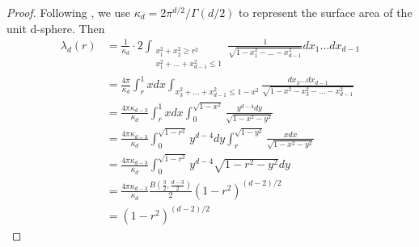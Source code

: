 \documentclass{aptpub}
\begin{document}
\begin{proof}
     Following \cite{dwyer1991convex}, we use $\kappa_d = 2\pi^{d/2}/\Gamma(d/2)$
     to represent the surface area of the unit d-sphere. Then
     \begin{align*}
          \lambda_d(r) &=\frac{1}{\kappa_d} 
          \cdot 2\int_{\substack{x_1^2+x_2^2\geq r^2\\
          x_1^2+\dots+x_{d-1}^2\leq 1 }} 
          \frac{1}{\sqrt{1-x_1^2-\dots -x_{d-1}^2}} dx_1 \dots dx_{d-1}\\
      &= \frac{4\pi}{\kappa_d} \int_r^1 xdx \int_{x_3^2+\dots + x_{d-1}^2 \leq 1-x^2} \frac{dx_3\dots dx_{d-1}}
      {\sqrt{1-x^2-x_3^2-\dots -x_{d-1}^2}} \\
      &=\frac{4\pi \kappa_{d-3}}{\kappa_d} \int_r^1 xdx \int_0^{\sqrt{1-x^2}} \frac{y^{d-4}dy}{\sqrt{1-x^2-y^2}}\\
      &=\frac{4\pi \kappa_{d-3}}{\kappa_d} \int_0^{\sqrt{1-r^2}} y^{d-4}dy \int_r^{\sqrt{1-y^2}} \frac{xdx}{\sqrt{1-x^2-y^2}}\\
      &=\frac{4\pi \kappa_{d-3}}{\kappa_d} \int_0^{\sqrt{1-r^2}} y^{d-4}\sqrt{1-r^2-y^2} dy\\
      &=\frac{4\pi \kappa_{d-3}}{\kappa_d}  \frac{B(\frac{3}{2 }, \frac{d-3}{2})}{2}(1-r^2)^{(d-2)/2}\\
      &=  (1-r^2)^{(d-2)/2}
      \end{align*}
\end{proof}
\end{document}

